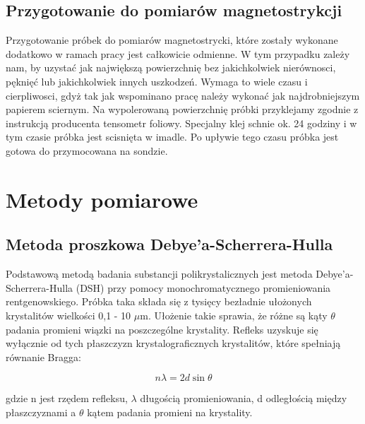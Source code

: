 \documentclass[a4paper,12pt]{article}
\numberwithin{equation}{section}
\begin{document}
\subsection{Przygotowanie do pomiarów magnetostrykcji}

Przygotowanie próbek do pomiarów magnetostrycki, które zostały wykonane dodatkowo w ramach pracy jest całkowicie 
odmienne. W tym przypadku zależy nam, by uzystać jak największą powierzchnię bez jakichkolwiek nierównosci, pęknięć 
lub jakichkolwiek innych uszkodzeń. Wymaga to wiele czasu i cierpliwosci, gdyż tak jak wspominano pracę należy 
wykonać jak najdrobniejszym papierem sciernym. Na wypolerowaną powierzchnię próbki przyklejamy zgodnie z 
instrukcją producenta tensometr foliowy. Specjalny klej schnie ok. 24 godziny i w tym czasie próbka jest scisnięta w
imadle. Po upływie tego czasu próbka jest gotowa do przymocowana na sondzie.

\section{Metody pomiarowe}




\subsection{Metoda proszkowa Debye'a-Scherrera-Hulla}

Podstawową metodą badania substancji polikrystalicznych jest metoda Debye'a-Scherrera-Hulla (DSH) przy pomocy monochromatycznego
promieniowania rentgenowskiego. Próbka taka składa się z tysięcy bezładnie ułożonych krystalitów wielkości  0,1 - 10 $\mu$m. Ułożenie
takie sprawia, że różne są kąty $\theta$ padania promieni wiązki na poszczególne krystality. Refleks uzyskuje się wyłącznie od tych płaszczyzn krystalograficznych krystalitów, które spełniają równanie Bragga:

  \begin{equation}
    n\lambda = 2d\sin\theta
    \label{eq:bragg}
  \end{equation}

gdzie n jest rzędem refleksu, $\lambda$ długością promieniowania, d odległością między płaszczyznami a $\theta$ kątem padania promieni na krystality.
\end{document}
